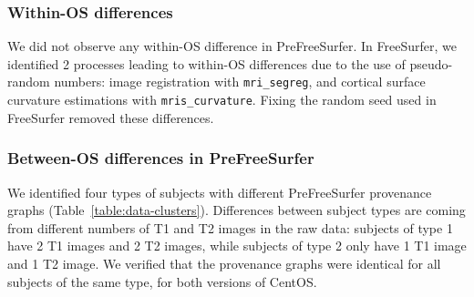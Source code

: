 \documentclass[a4paper,num-refs]{oup-contemporary}
\begin{document}


\subsubsection{Within-OS differences}

We did not observe any within-OS difference in PreFreeSurfer. In
FreeSurfer, we identified 2 processes leading to within-OS differences due
to the use of pseudo-random numbers: image registration with
\texttt{mri\_segreg}, and cortical surface curvature estimations with
\texttt{mris\_curvature}. Fixing the random seed used in FreeSurfer removed
these differences. 

\subsubsection{Between-OS differences in PreFreeSurfer}

We identified four types of subjects with different PreFreeSurfer
provenance graphs (Table~\ref{table:data-clusters}). Differences between
subject types are coming from different  numbers of T1 and T2 images in the
raw data: subjects of type 1 have 2 T1 images and 2 T2 images, while
subjects of type 2 only have 1 T1 image and 1 T2 image. We verified that
the provenance graphs were identical for all subjects of the same type, for
both versions of CentOS.
\end{document}
